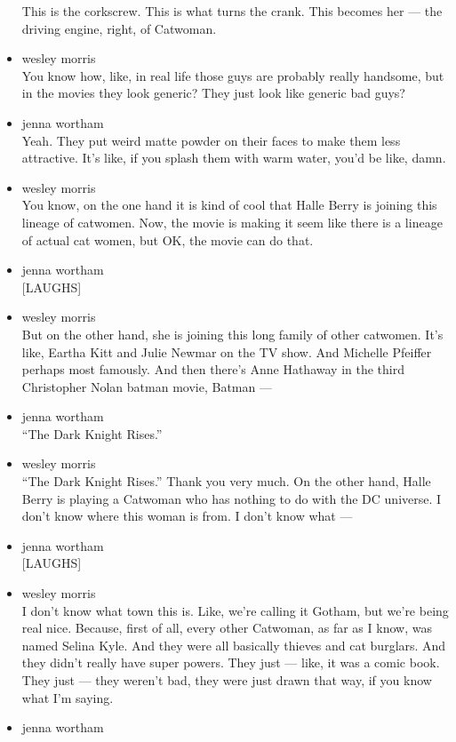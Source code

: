 \begin{itemize}
  This is the corkscrew. This is what turns the crank. This becomes her
  --- the driving engine, right, of Catwoman.
\item
  wesley morris\\
  You know how, like, in real life those guys are probably really
  handsome, but in the movies they look generic? They just look like
  generic bad guys?
\item
  jenna wortham\\
  Yeah. They put weird matte powder on their faces to make them less
  attractive. It's like, if you splash them with warm water, you'd be
  like, damn.
\item
  wesley morris\\
  You know, on the one hand it is kind of cool that Halle Berry is
  joining this lineage of catwomen. Now, the movie is making it seem
  like there is a lineage of actual cat women, but OK, the movie can do
  that.
\item
  jenna wortham\\
  {[}LAUGHS{]}
\item
  wesley morris\\
  But on the other hand, she is joining this long family of other
  catwomen. It's like, Eartha Kitt and Julie Newmar on the TV show. And
  Michelle Pfeiffer perhaps most famously. And then there's Anne
  Hathaway in the third Christopher Nolan batman movie, Batman ---
\item
  jenna wortham\\
  ``The Dark Knight Rises.''
\item
  wesley morris\\
  ``The Dark Knight Rises.'' Thank you very much. On the other hand,
  Halle Berry is playing a Catwoman who has nothing to do with the DC
  universe. I don't know where this woman is from. I don't know what ---
\item
  jenna wortham\\
  {[}LAUGHS{]}
\item
  wesley morris\\
  I don't know what town this is. Like, we're calling it Gotham, but
  we're being real nice. Because, first of all, every other Catwoman, as
  far as I know, was named Selina Kyle. And they were all basically
  thieves and cat burglars. And they didn't really have super powers.
  They just --- like, it was a comic book. They just --- they weren't
  bad, they were just drawn that way, if you know what I'm saying.
\item
  jenna wortham\\

\end{itemize}
